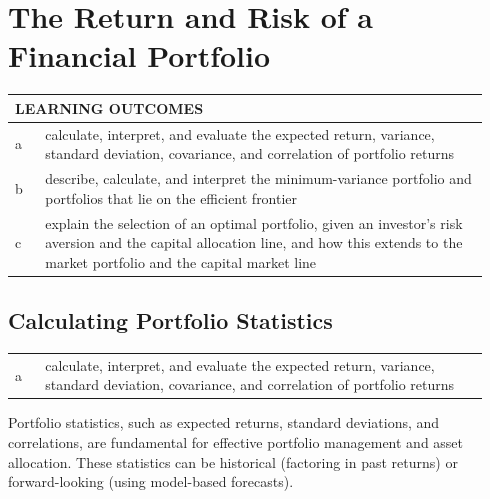 \chapter{The Return and Risk of a Financial Portfolio}
\label{chap:The Return and Risk of a Financial Portfolio}
\begin{center}
\begin{tabular}{p{0.06\linewidth} | p{0.88\linewidth}}
	\toprule
	\multicolumn{2}{l}{\textbf{LEARNING OUTCOMES}} \\
	\midrule
	a & calculate, interpret, and evaluate the expected return, variance, standard deviation, covariance, and correlation of portfolio returns \\
	\midrule
	b & describe, calculate, and interpret the minimum-variance portfolio and portfolios that lie on the efficient frontier \\
	\midrule
	c & explain the selection of an optimal portfolio, given an investor's risk aversion and the capital allocation line, and how this extends to the market portfolio and the capital market line \\
	\bottomrule
\end{tabular}
\end{center}
\vspace{1.5em}
\section{Calculating Portfolio Statistics}
\label{sec:Calculating Portfolio Statistics}
\begin{center}
\begin{tabular}{p{0.06\linewidth} | p{0.88\linewidth}}
	a & calculate, interpret, and evaluate the expected return, variance, standard deviation, covariance, and correlation of portfolio returns \\
\end{tabular}
\end{center}
Portfolio statistics, such as expected returns, standard deviations, and correlations, are fundamental for effective portfolio management and asset allocation. These statistics can be historical (factoring in past returns) or forward-looking (using model-based forecasts).
